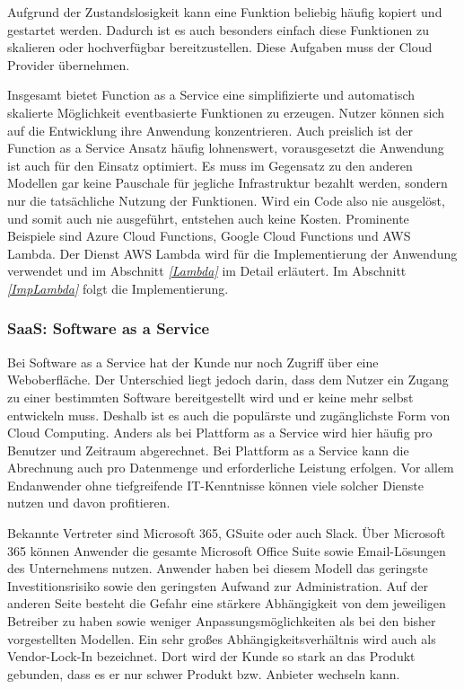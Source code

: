    Aufgrund der Zustandslosigkeit kann eine Funktion beliebig häufig kopiert und gestartet werden.
   Dadurch ist es auch besonders einfach diese Funktionen zu skalieren oder hochverfügbar bereitzustellen.
   Diese Aufgaben muss der Cloud Provider übernehmen.

   Insgesamt bietet Function as a Service eine simplifizierte und automatisch skalierte Möglichkeit eventbasierte Funktionen zu erzeugen.
   Nutzer können sich auf die Entwicklung ihre Anwendung konzentrieren.
   Auch preislich ist der Function as a Service Ansatz häufig lohnenswert, vorausgesetzt die Anwendung ist auch für den Einsatz optimiert.
   Es muss im Gegensatz zu den anderen Modellen gar keine Pauschale für
   jegliche Infrastruktur bezahlt werden, sondern nur die tatsächliche Nutzung der Funktionen. Wird ein Code also nie ausgelöst, und somit auch nie ausgeführt,
   entstehen auch keine Kosten.
   Prominente Beispiele sind Azure Cloud Functions, Google Cloud Functions und AWS Lambda.
   Der Dienst AWS Lambda wird für die Implementierung der Anwendung verwendet und im Abschnitt \textit{\ref{Lambda} } im Detail erläutert.
   Im Abschnitt \textit{\ref{ImpLambda} } folgt die Implementierung.\cite[]{LambdaZitat}

   \subsubsection{SaaS: Software as a Service}
   Bei Software as a Service hat der Kunde nur noch Zugriff über eine Weboberfläche.
   Der Unterschied liegt jedoch darin, dass dem Nutzer ein Zugang zu einer bestimmten Software bereitgestellt wird und er keine mehr selbst entwickeln muss.
   Deshalb ist es auch die populärste und zugänglichste Form von Cloud Computing.
   Anders als bei Plattform as a Service wird hier häufig pro Benutzer und Zeitraum abgerechnet.
   Bei Plattform as a Service kann die Abrechnung auch pro Datenmenge und erforderliche Leistung erfolgen.
   Vor allem Endanwender ohne tiefgreifende IT-Kenntnisse können viele solcher Dienste nutzen und davon profitieren. \cite[]{SaaS}

   Bekannte Vertreter sind Microsoft 365, GSuite oder auch Slack.
   Über Microsoft 365 können Anwender die gesamte Microsoft Office Suite sowie Email-Lösungen des Unternehmens nutzen.
   Anwender haben bei diesem Modell das geringste Investitionsrisiko sowie den geringsten Aufwand zur Administration.
   Auf der anderen Seite besteht die Gefahr eine stärkere Abhängigkeit von dem jeweiligen Betreiber zu haben sowie weniger Anpassungsmöglichkeiten als bei den bisher vorgestellten Modellen.
   Ein sehr großes Abhängigkeitsverhältnis wird auch als Vendor-Lock-In bezeichnet. Dort wird der Kunde so stark an das Produkt gebunden, dass es er nur schwer Produkt bzw. Anbieter wechseln kann.



